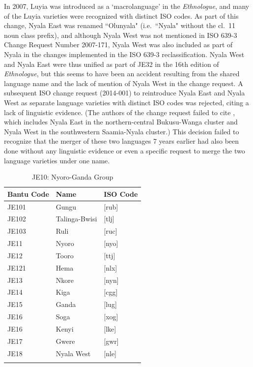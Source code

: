 \documentclass[output=paper]{langscibook}
\begin{document}
In 2007, Luyia was introduced as a `macrolanguage' in the \textit{Ethnologue}, and many of the Luyia varieties were recognized with distinct ISO codes. As part of this change, Nyala East was renamed ``Olunyala" (i.e.\ ``Nyala" without the cl.\ 11 noun class prefix), and although Nyala West was not mentioned in ISO 639-3 Change Request Number 2007-171, Nyala West was also included as part of Nyala in the changes implemented in the ISO 639-3 reclassification. Nyala West and Nyala East were thus unified as part of JE32 in the 16th edition of \textit{Ethnologue}, but this seems to have been an accident resulting from the shared language name and the lack of mention of Nyala West in the change request. A subsequent ISO change request (2014-001) to reintroduce Nyala East and Nyala West as separate language varieties with distinct ISO codes was rejected, citing a lack of linguistic evidence. (The authors of the change request failed to cite \citet{heine_language_1980}, which includes Nyala East in the northern-central Bukusu-Wanga cluster and Nyala West in the southwestern Saamia-Nyala cluster.) This decision failed to recognize that the merger of these two languages 7 years earlier had also been done without any linguistic evidence or even a specific request to merge the two language varieties under one name.

\begin{table}
\caption{JE10: Nyoro-Ganda Group \citep{maho_nugl_2009}}
\label{tab:3:JE10}
 \begin{tabular}{lll} 
  \lsptoprule
  Bantu Code & Name & ISO Code \\ 
  \midrule
  JE101  & Gungu  & [rub] \\
  JE102  & Talinga-Bwisi  & [tlj] \\
  JE103  & Ruli  & [ruc] \\
  JE11  & Nyoro  & [nyo] \\
  JE12  & Tooro  & [ttj] \\
  JE121  & Hema  & [nlx] \\
  JE13  & Nkore  & [nyn] \\
  JE14  & Kiga  & [cgg] \\
  JE15  & Ganda  & [lug] \\
  JE16  & Soga  & [xog] \\
  JE16  & Kenyi  & [lke] \\
  JE17  & Gwere  & [gwr] \\
  JE18  & Nyala West  & [nle] \\
  \lspbottomrule
 \end{tabular}
\end{table}
\end{document}
